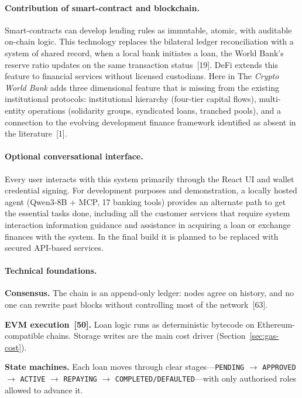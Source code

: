 \documentclass[12pt, a4paper]{report}
\begin{document}
\paragraph{Contribution of smart-contract and blockchain.}
Smart-contracts can develop lending rules as immutable, atomic, with auditable on-chain logic. This technology replaces the bilateral ledger reconciliation with a system of shared record, when a local bank initiates a loan, the World Bank's reserve ratio updates on the same transaction status~[19]. DeFi extends this feature to financial services without licensed custodians. Here in The \textit{Crypto World Bank} adds three dimensional feature that is missing from the existing institutional protocols: institutional hierarchy (four-tier capital flows), multi-entity operations (solidarity groups, syndicated loans, tranched pools), and a connection to the evolving development finance framework identified as absent in the literature~[1].

\paragraph{Optional conversational interface.}
Every user interacts with this system primarily through the React UI and wallet credential signing. For development purposes and demonstration, a locally hosted agent (Qwen3-8B + MCP, 17 banking tools) provides an alternate path to get the essential tasks done, including all the customer services that require system interaction information guidance and assistance in acquiring a loan or exchange finances with the system. In the final build it is planned to be replaced with secured API-based services.

\paragraph{Technical foundations.}
\label{sec:blockchain-fundamentals}

\textbf{Consensus.} The chain is an append-only ledger: nodes agree on history, and no one can rewrite past blocks without controlling most of the network~[63].

\textbf{EVM execution~[50].} Loan logic runs as deterministic bytecode on Ethereum-compatible chains. Storage writes are the main cost driver (Section~\ref{sec:gas-cost}).

\textbf{State machines.} Each loan moves through clear stages---\texttt{PENDING} $\to$ \texttt{APPROVED} $\to$ \texttt{ACTIVE} $\to$ \texttt{REPAYING} $\to$ \texttt{COMPLETED/DEFAULTED}---with only authorised roles allowed to advance it.
\end{document}
